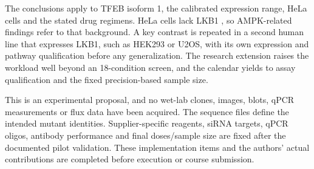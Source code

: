 The conclusions apply to TFEB isoform 1, the calibrated expression range, HeLa cells and the stated drug regimens. HeLa cells lack LKB1 \cite{Fogarty2010}, so AMPK-related findings refer to that background. A key contrast is repeated in a second human line that expresses LKB1, such as HEK293 or U2OS, with its own expression and pathway qualification before any generalization. The research extension raises the workload well beyond an 18-condition screen, and the calendar yields to assay qualification and the fixed precision-based sample size.

This is an experimental proposal, and no wet-lab clones, images, blots, qPCR measurements or flux data have been acquired. The sequence files define the intended mutant identities. Supplier-specific reagents, siRNA targets, qPCR oligos, antibody performance and final doses/sample size are fixed after the documented pilot validation. These implementation items and the authors' actual contributions are completed before execution or course submission.
